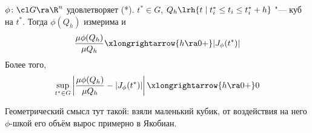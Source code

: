 \begin{theorem}
	$\phi\colon \cl G \ra \R^n$ удовлетворяет (*).
	$t^* \in G$, $Q_h \lrh \{t \mid t^*_i \le t_i \le t^*_i + h\}$ "--- куб на $t^*$.
	Тогда $\phi(Q_h)$ измерима и
	\[
		\frac{\mu \phi(Q_h)}{\mu Q_h} \xlongrightarrow{h \ra 0+} |J_\phi(t^*)|
	\]
	Более того,
	\[
		\sup_{t^* \in G} \left| \frac{\mu \phi(Q_h)}{\mu Q_h} - |J_\phi(t^*)|\right| \xlongrightarrow{h \ra 0+} 0
	\]
\end{theorem}
\begin{Rem}
	Геометрический смысл тут такой: взяли маленький кубик, от воздействия на него $\phi$-шкой его объём вырос примерно в Якобиан.
\end{Rem}